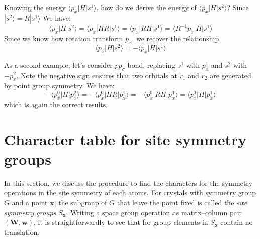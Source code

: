 \documentclass{article}
\begin{document}
Knowing the energy $\langle p_x | H | s^1 \rangle$, how do we derive the energy 
of $\langle p_x | H | s^2 \rangle$? Since $| s^2 \rangle = R | s^1 \rangle$ We have:
\begin{equation}
    \langle p_x | H | s^2 \rangle = \langle p_x | H R | s^1 \rangle
    = \langle p_x | R H | s^1 \rangle = \langle R^{-1} p_x | H | s^1 \rangle
\end{equation}
Since we know how rotation transform $p_x$, we recover the relationship 
\begin{equation}
    \langle p_x | H | s^2 \rangle = - \langle p_x | H | s^1 \rangle
\end{equation}

As a second example, let's consider $pp_{\sigma}$ bond, replacing $s^1$ with $p_x^1$ 
and $s^2$ with $-p_x^2$. Note the negative sign ensures that two orbitals at $r_1$ and $r_2$
are generated by point group symmetry. 
We have:
\begin{equation}
    - \langle p_x^0 | H | p_x^2 \rangle =  - \langle p_x^0 | HR | p_x^1 \rangle 
    = - \langle p_x^0 | RH | p_x^1 \rangle = \langle p_x^0 | H | p_x^1 \rangle
\end{equation} 
which is again the correct results. 



\newpage
\appendix

\section{Character table for site symmetry groups}
In this section, we discuss the procedure to find the characters for the 
symmetry operations in the site symmetry of each atoms. For crystals with 
symmetry group $G$ and a point $\mathbf{x}$, the subgroup of $G$ that leave
the point fixed is called the \emph{site symmetry groups} $S_{\mathbf{x}}$. 
Writing a space group operation as matrix--column pair $(\mathbf{W},\mathbf{w})$, 
it is straightforwardly to see that for group elements in $S_{\mathbf{x}}$ 
contain no translation. 
\end{document}
